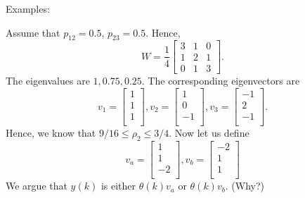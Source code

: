 \documentclass{article}
\begin{document}
Examples:
\begin{figure}[h]
  \begin{center}
  \end{center}
\end{figure}

Assume that $p_{12} = 0.5$, $p_{23} = 0.5$. Hence,
\begin{displaymath}
  W = \frac{1}{4}\begin{bmatrix}
    3&1&0\\
    1&2&1\\
    0&1&3
  \end{bmatrix}.
\end{displaymath}
The eigenvalues are $1, 0.75, 0.25$. The corresponding eigenvectors are
\begin{displaymath}
  v_1 = \begin{bmatrix}
    1\\
    1\\
    1\\
  \end{bmatrix}, v_2 = \begin{bmatrix}
    1\\
    0\\
    -1\\
  \end{bmatrix}, v_3 = \begin{bmatrix}
    -1\\
    2\\
    -1\\
  \end{bmatrix}.
\end{displaymath}
Hence, we know that $9/16\leq \rho_2 \leq 3/4$. Now let us define
\begin{displaymath}
    v_a = \begin{bmatrix}
    1\\
    1\\
    -2\\
  \end{bmatrix}, v_b = \begin{bmatrix}
    -2\\
    1\\
    1\\
  \end{bmatrix}
\end{displaymath}
We argue that $y(k)$ is either $\theta(k) v_a$ or $\theta(k) v_b$. (Why?)
\end{document}
